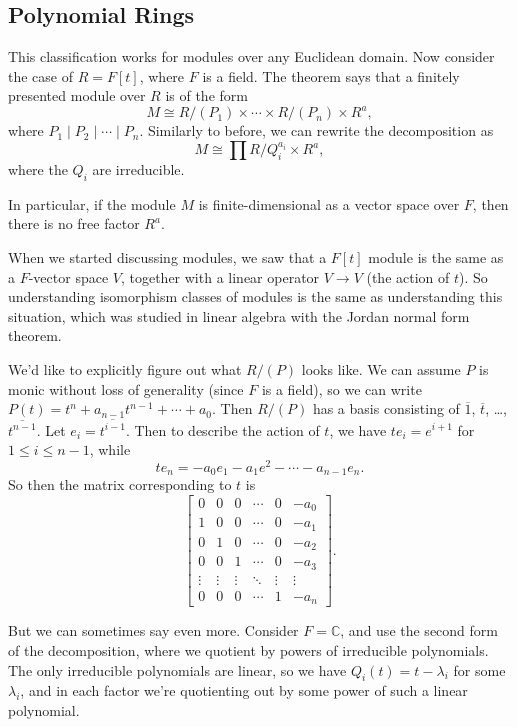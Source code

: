 \subsection{Polynomial Rings}

This classification works for modules over any Euclidean domain. Now consider the case of $R = F[t]$, where $F$ is a field. The theorem says that a finitely presented module over $R$ is of the form \[M \cong R/(P_1) \times \cdots \times R/(P_n) \times R^a,\] where $P_1 \mid P_2 \mid \cdots \mid P_n$. Similarly to before, we can rewrite the decomposition as \[M \cong \prod R/Q_i^{a_i} \times R^a,\] where the $Q_i$ are irreducible. 

In particular, if the module $M$ is finite-dimensional as a vector space over $F$, then there is no free factor $R^a$. 

When we started discussing modules, we saw that a $F[t]$ module is the same as a $F$-vector space $V$, together with a linear operator $V \to V$ (the action of $t$). So understanding isomorphism classes of modules is the same as understanding this situation, which was studied in linear algebra with the Jordan normal form theorem. 

We'd like to explicitly figure out what $R/(P)$ looks like. We can assume $P$ is monic without loss of generality (since $F$ is a field), so we can write $P(t) = t^n + a_{n - 1}t^{n - 1} + \cdots + a_0$. Then $R/(P)$ has a basis consisting of $\overline{1}$, $\overline{t}$, \ldots, $\overline{t^{n - 1}}$. Let $e_i = \overline{t^{i - 1}}$. Then to describe the action of $t$, we have $te_i = e^{i + 1}$ for $1 \leq i \leq n - 1$, while \[te_n = -a_0e_1 - a_1e^2 - \cdots - a_{n - 1}e_n.\] So then the matrix corresponding to $t$ is \[\begin{bmatrix} 0 & 0 & 0 & \cdots & 0 & -a_0 \\ 1 & 0 & 0 & \cdots & 0 & -a_1 \\ 0 & 1 & 0 & \cdots & 0 & -a_2 \\ 0 & 0 & 1 & \cdots & 0 & -a_3 \\ \vdots & \vdots & \vdots & \ddots & \vdots & \vdots \\ 0 & 0 & 0 & \cdots & 1 & -a_n\end{bmatrix}.\] 

But we can sometimes say even more. Consider $F = \mathbb{C}$, and use the second form of the decomposition, where we quotient by powers of irreducible polynomials. The only irreducible polynomials are linear, so we have $Q_i(t) = t - \lambda_i$ for some $\lambda_i$, and in each factor we're quotienting out by some power of such a linear polynomial. 

